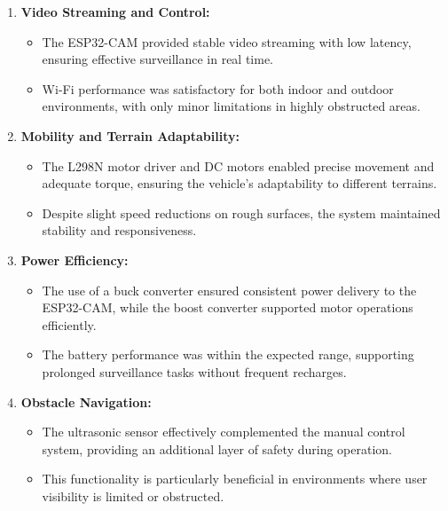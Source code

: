 \documentclass[12pt,a4paper]{report}
\begin{document}
\begin{enumerate}
    \item \textbf{Video Streaming and Control:}
    \begin{itemize}
        \item The ESP32-CAM provided stable video streaming with low latency, ensuring effective surveillance in real time.
        \item Wi-Fi performance was satisfactory for both indoor and outdoor environments, with only minor limitations in highly obstructed areas.
    \end{itemize}
    
    \item \textbf{Mobility and Terrain Adaptability:}
    \begin{itemize}
        \item The L298N motor driver and DC motors enabled precise movement and adequate torque, ensuring the vehicle’s adaptability to different terrains.
        \item Despite slight speed reductions on rough surfaces, the system maintained stability and responsiveness.
    \end{itemize}
    
    \item \textbf{Power Efficiency:}
    \begin{itemize}
        \item The use of a buck converter ensured consistent power delivery to the ESP32-CAM, while the boost converter supported motor operations efficiently.
        \item The battery performance was within the expected range, supporting prolonged surveillance tasks without frequent recharges.
    \end{itemize}
    
    \item \textbf{Obstacle Navigation:}
    \begin{itemize}
        \item The ultrasonic sensor effectively complemented the manual control system, providing an additional layer of safety during operation.
        \item This functionality is particularly beneficial in environments where user visibility is limited or obstructed.
    \end{itemize}
\end{enumerate}
\end{document}
